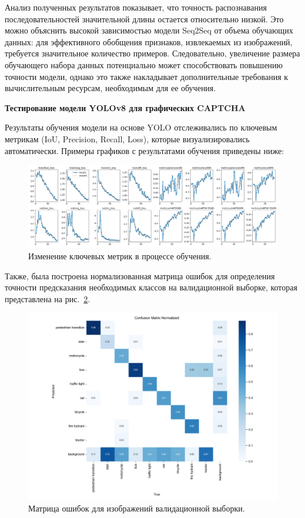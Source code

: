 Анализ полученных результатов показывает, что точность распознавания 
последовательностей значительной длины остается относительно низкой. Это можно 
объяснить высокой зависимостью модели Seq2Seq от объема обучающих данных: для 
эффективного обобщения признаков, извлекаемых из изображений, требуется 
значительное количество примеров. Следовательно, увеличение размера обучающего 
набора данных потенциально может способствовать повышению точности модели, 
однако это также накладывает дополнительные требования к вычислительным ресурсам, 
необходимым для ее обучения.

\textbf{Тестирование модели YOLOv8 для графических CAPTCHA}

Результаты обучения модели на основе YOLO отслеживались по ключевым метрикам 
(IoU, Precision, Recall, Loss), которые визуализировались автоматически. Примеры 
графиков с результатами обучения приведены ниже:

\begin{figure}[H]
    \centering
    \includegraphics[width=1\linewidth]{imgs/imagecaptcha/results.png}
    \caption{Изменение ключевых метрик в процессе обучения.}
    \label{fig:metrics}
\end{figure}
\vspace{-0.5cm}

Также, была построена нормализованная матрица ошибок для определения точности 
предсказания необходимых классов на валидационной выборке, которая представлена 
на рис.~\ref{fig:confusion}.

\begin{figure}[H]
    \centering
    \includegraphics[width=1\linewidth]{
        imgs/imagecaptcha/confusion_matrix_normalized.png
    }
    \caption{Матрица ошибок для изображений валидационной выборки.}
    \label{fig:confusion}
\end{figure}
\vspace{-0.5cm}

